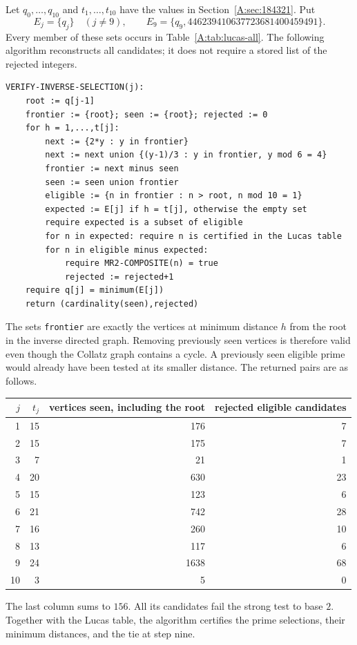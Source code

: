 \documentclass[11pt,a4paper]{article}
\theoremstyle{definition}
\theoremstyle{remark}
\numberwithin{equation}{section}
\begin{document}
Let $q_0,\ldots,q_{10}$ and $t_1,\ldots,t_{10}$ have the values in
Section~\ref{A:sec:184321}. Put
\[
 E_j=\{q_j\}\quad(j\ne9),\qquad
 E_9=\{q_9,446239410637723681400459491\}.
\]
Every member of these sets occurs in Table~\ref{A:tab:lucas-all}. The
following algorithm reconstructs all candidates; it does not require a
stored list of the rejected integers.
\begin{verbatim}
VERIFY-INVERSE-SELECTION(j):
    root := q[j-1]
    frontier := {root}; seen := {root}; rejected := 0
    for h = 1,...,t[j]:
        next := {2*y : y in frontier}
        next := next union {(y-1)/3 : y in frontier, y mod 6 = 4}
        frontier := next minus seen
        seen := seen union frontier
        eligible := {n in frontier : n > root, n mod 10 = 1}
        expected := E[j] if h = t[j], otherwise the empty set
        require expected is a subset of eligible
        for n in expected: require n is certified in the Lucas table
        for n in eligible minus expected:
            require MR2-COMPOSITE(n) = true
            rejected := rejected+1
    require q[j] = minimum(E[j])
    return (cardinality(seen),rejected)
\end{verbatim}
The sets \texttt{frontier} are exactly the vertices at minimum distance
$h$ from the root in the inverse directed graph. Removing previously seen
vertices is therefore valid even though the Collatz graph contains a
cycle. A previously seen eligible prime would already have been tested
at its smaller distance. The returned pairs are as follows.
\begin{center}
\begin{tabular}{r r r r}
\toprule
$j$ & $t_j$ & vertices seen, including the root & rejected eligible candidates\\
\midrule
1&15&176&7\\
2&15&175&7\\
3&7&21&1\\
4&20&630&23\\
5&15&123&6\\
6&21&742&28\\
7&16&260&10\\
8&13&117&6\\
9&24&1638&68\\
10&3&5&0\\\bottomrule
\end{tabular}
\end{center}
The last column sums to $156$. All its candidates fail the strong test
to base $2$. Together with the Lucas table, the algorithm certifies the
prime selections, their minimum distances, and the tie at step nine.
\end{document}
